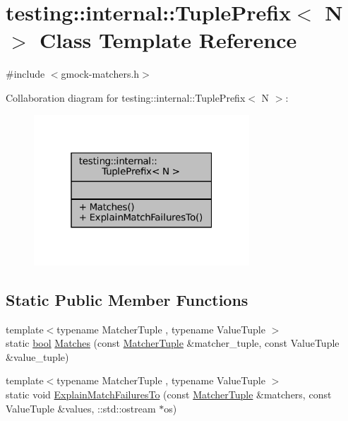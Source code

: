 \hypertarget{classtesting_1_1internal_1_1TuplePrefix}{}\section{testing\+:\+:internal\+:\+:Tuple\+Prefix$<$ N $>$ Class Template Reference}
\label{classtesting_1_1internal_1_1TuplePrefix}


{\ttfamily \#include $<$gmock-\/matchers.\+h$>$}



Collaboration diagram for testing\+:\+:internal\+:\+:Tuple\+Prefix$<$ N $>$\+:
\nopagebreak
\begin{figure}[H]
\begin{center}
\leavevmode
\includegraphics[width=229pt]{classtesting_1_1internal_1_1TuplePrefix__coll__graph}
\end{center}
\end{figure}
\subsection*{Static Public Member Functions}
\begin{DoxyCompactItemize}
\item 
{\footnotesize template$<$typename Matcher\+Tuple , typename Value\+Tuple $>$ }\\static \hyperlink{classbool}{bool} \hyperlink{classtesting_1_1internal_1_1TuplePrefix_ada24ceee73c02e3bb7f8264143170f7a}{Matches} (const \hyperlink{structtesting_1_1internal_1_1MatcherTuple}{Matcher\+Tuple} \&matcher\+\_\+tuple, const Value\+Tuple \&value\+\_\+tuple)
\item 
{\footnotesize template$<$typename Matcher\+Tuple , typename Value\+Tuple $>$ }\\static void \hyperlink{classtesting_1_1internal_1_1TuplePrefix_a0ffd38ce90ae6da645a5655aefac5bb7}{Explain\+Match\+Failures\+To} (const \hyperlink{structtesting_1_1internal_1_1MatcherTuple}{Matcher\+Tuple} \&matchers, const Value\+Tuple \&values, \+::std\+::ostream $\ast$os)
\end{DoxyCompactItemize}


